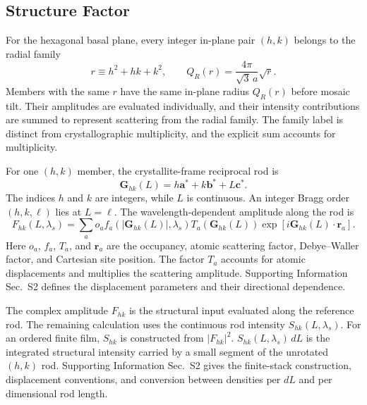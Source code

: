 \subsection{Structure Factor}
\label{sec:structure_factor}
For the hexagonal basal plane, every integer in-plane pair $(h,k)$ belongs to the radial family
\begin{equation}
  r\equiv h^2+hk+k^2,
  \qquad
  Q_R(r)=\frac{4\pi}{\sqrt{3}\,a}\sqrt r.
  \label{eq:hexagonal_family_index}
\end{equation}
Members with the same $r$ have the same in-plane radius $Q_R(r)$ before mosaic tilt. Their amplitudes are evaluated individually, and their intensity contributions are summed to represent scattering from the radial family. The family label is distinct from crystallographic multiplicity, and the explicit sum accounts for multiplicity.

For one $(h,k)$ member, the crystallite-frame reciprocal rod is
\begin{equation}
  \mathbf G_{hk}(L)=h\mathbf a^{*}+k\mathbf b^{*}+L\mathbf c^{*}.
  \label{eq:continuous_reciprocal_rod}
\end{equation}
The indices $h$ and $k$ are integers, while $L$ is continuous. An integer Bragg order $(h,k,\ell)$ lies at $L=\ell$. The wavelength-dependent amplitude along the rod is
\begin{equation}
  F_{hk}(L,\lambda_s)=
  \sum_a o_a f_a\!\left(|\mathbf G_{hk}(L)|,\lambda_s\right)
  T_a\!\left(\mathbf G_{hk}(L)\right)
  \exp\!\left[i\mathbf G_{hk}(L)\cdot\mathbf r_a\right].
  \label{eq:continuous_structure_factor}
\end{equation}
Here $o_a$, $f_a$, $T_a$, and $\mathbf r_a$ are the occupancy, atomic scattering factor, Debye--Waller factor, and Cartesian site position. The factor $T_a$ accounts for atomic displacements and multiplies the scattering amplitude. Supporting Information Sec.~S2 defines the displacement parameters and their directional dependence.

The complex amplitude $F_{hk}$ is the structural input evaluated along the reference rod. The remaining calculation uses the continuous rod intensity $S_{hk}(L,\lambda_s)$. For an ordered finite film, $S_{hk}$ is constructed from $|F_{hk}|^2$. $S_{hk}(L,\lambda_s)\,dL$ is the integrated structural intensity carried by a small segment of the unrotated $(h,k)$ rod. Supporting Information Sec.~S2 gives the finite-stack construction, displacement conventions, and conversion between densities per $dL$ and per dimensional rod length.

